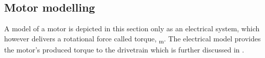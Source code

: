 \subsection{Motor modelling}\label{motormodelling}
A model of a motor is depicted in this section only as an electrical system, which however delivers a rotational force called torque, \si{\tau_m}. The electrical model provides the motor's produced torque to the drivetrain which is further discussed in .

%
%
%
%
%
%
%
%
%
%

